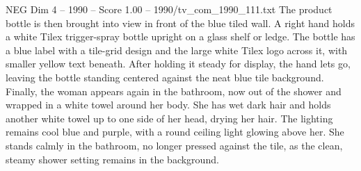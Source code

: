 \begin{textsample}{NEG Dim 4 – 1990 – Score 1.00 – 1990/tv\_com\_1990\_111.txt}
The product bottle is then brought into view in front of the blue tiled wall.
A right hand holds a white Tilex trigger-spray bottle upright on a glass shelf or ledge.
The bottle has a blue label with a tile-grid design and the large white Tilex logo across it, with smaller yellow text beneath.
After holding it steady for display, the hand lets go, leaving the bottle standing centered against the neat blue tile background.
Finally, the woman appears again in the bathroom, now out of the shower and wrapped in a white towel around her body.
She has wet dark hair and holds another white towel up to one side of her head, drying her hair.
The lighting remains cool blue and purple, with a round ceiling light glowing above her.
She stands calmly in the bathroom, no longer pressed against the tile, as the clean, steamy shower setting remains in the background.

\end{textsample}
